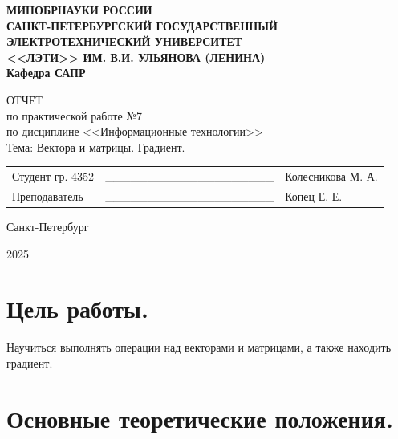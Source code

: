 \documentclass[14pt,a4paper]{extarticle}
\begin{document}
\begin{titlepage}
    \begin{center}
    {\bfseries
    МИНОБРНАУКИ РОССИИ \\ САНКТ-ПЕТЕРБУРГСКИЙ ГОСУДАРСТВЕННЫЙ \\ ЭЛЕКТРОТЕХНИЧЕСКИЙ УНИВЕРСИТЕТ \\ <<ЛЭТИ>> ИМ. В.И. УЛЬЯНОВА (ЛЕНИНА)\\Кафедра САПР \vspace{0.23\textheight}
    
    ОТЧЕТ \\ по практической работе №7 \\ по дисциплине <<Информационные технологии>> \\ Тема: Вектора и матрицы. Градиент. \\
    \vspace{0.28\textheight}
        }
        \begin{table}[h!]
            \begin{tabularx}{\textwidth}{p{60mm}X>{\centering\arraybackslash}p{45mm}}
                Студент гр. 4352 & \_\_\_\_\_\_\_\_\_\_\_\_\_\_\_\_\_\_\_\_ & {Колесникова М. А.} \\ [5.4mm]  
                Преподаватель    & \_\_\_\_\_\_\_\_\_\_\_\_\_\_\_\_\_\_\_\_ & {Копец Е. Е.} \\ [5.4mm]
            \end{tabularx}
        \end{table}
    Санкт-Петербург\par
        2025
    \end{center}
\end{titlepage}
\setcounter{page}{2}

\section*{Цель работы.}

Научиться выполнять операции над векторами и матрицами, а также находить градиент.

\section*{Основные теоретические положения.}
\end{document}
